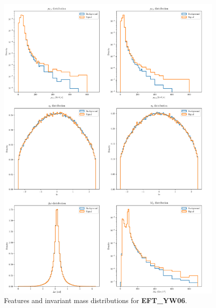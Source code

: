 \begin{figure}
	\centering
	\includegraphics[width=1.0\textwidth]{Python/Z/features_EFT_YW06.pdf}
	\caption{Features and invariant mass distributions for \textbf{EFT\_YW06}.}
	\label{fig:EFT_YW06_FEATURES_DISTRIBUTIONS}
\end{figure}